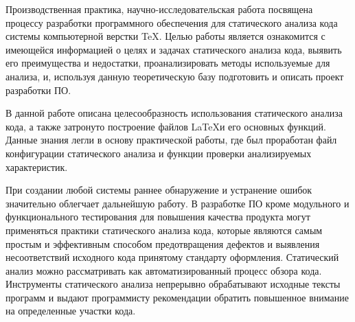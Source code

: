 \intro
Производственная практика, научно-исследовательская работа посвящена процессу разработки программного обеспечения для статического анализа кода системы компьютерной верстки \TeX. Целью работы является ознакомится с имеющейся информацией о целях и задачах статического анализа кода, выявить его преимущества и недостатки, проанализировать методы используемые для анализа, и, используя данную теоретическую базу подготовить и описать проект разработки ПО.

 В данной работе описана целесообразность использования статического анализа кода, а также затронуто построение файлов \LaTeX и его основных функций. Данные знания легли в основу практической работы, где был проработан файл конфигурации статического анализа и функции проверки анализируемых характеристик.

При создании любой системы раннее обнаружение и устранение ошибок значительно облегчает дальнейшую работу. В разработке ПО кроме модульного и функционального тестирования для повышения качества продукта могут применяться практики статического анализа кода, которые являются самым простым и эффективным способом предотвращения дефектов и выявления несоответствий исходного кода принятому стандарту оформления. Статический анализ можно рассматривать как автоматизированный процесс обзора кода. Инструменты статического анализа непрерывно обрабатывают исходные тексты программ и выдают программисту рекомендации обратить повышенное внимание на определенные участки кода.
